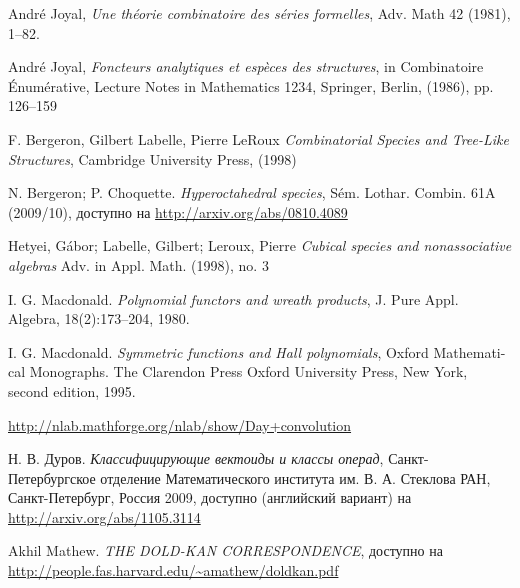 \begin{thebibliography}{9}

 André Joyal, \emph{Une théorie combinatoire des séries
formelles}, Adv. Math 42 (1981), 1–82.

 André Joyal, \emph{Foncteurs analytiques et espèces des
structures}, in Combinatoire Énumérative, Lecture Notes in Mathematics 1234, Springer,
Berlin, (1986), pp. 126–159

 F. Bergeron, Gilbert Labelle, Pierre LeRoux
\emph{Combinatorial Species and Tree-Like Structures}, Cambridge University Press, (1998)

 N. Bergeron; P. Choquette.
\emph{Hyperoctahedral species}, Sém. Lothar. Combin. 61A (2009/10), доступно на
\url{http://arxiv.org/abs/0810.4089}

 Hetyei, Gábor; Labelle, Gilbert;
Leroux, Pierre \emph{Cubical species and nonassociative algebras} Adv. in Appl.
Math. (1998), no. 3

 I. G. Macdonald. \emph{Polynomial functors and wreath
products}, J. Pure Appl. Algebra, 18(2):173–204, 1980.

 I. G. Macdonald. \emph{Symmetric functions and Hall polynomials},
Oxford Mathemati- cal Monographs.
The Clarendon Press Oxford University Press, New York, second edition, 1995.

 \url{http://nlab.mathforge.org/nlab/show/Day+convolution}

 Н. В. Дуров. \emph{Классифицирующие вектоиды и классы операд},
Санкт-Петербургское отделение Математического института им. В. А. Стеклова РАН,
Санкт-Петербург, Россия 2009, доступно (английский вариант) на
\url{http://arxiv.org/abs/1105.3114}

 Akhil Mathew. \emph{THE DOLD-KAN CORRESPONDENCE}, доступно на
\url{http://people.fas.harvard.edu/~amathew/doldkan.pdf}

\end{thebibliography}